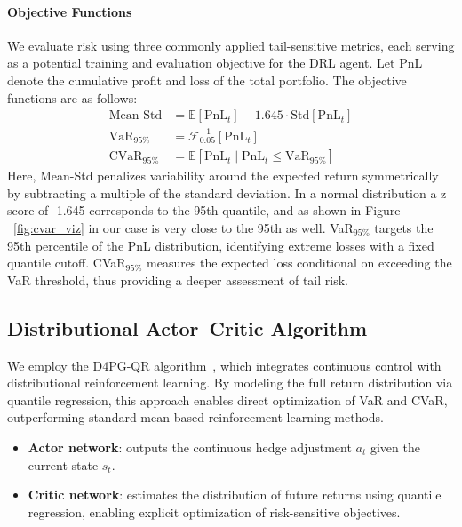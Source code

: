 \documentclass[a4paper,fleqn]{cas-dc}
\begin{document}
\paragraph{Objective Functions}
We evaluate risk using three commonly applied tail-sensitive metrics, each serving as a potential training and evaluation objective for the DRL agent. Let $\text{PnL}$ denote the cumulative profit and loss of the total portfolio. The objective functions are as follows:
\begin{align*}
    \text{Mean-Std} &= \mathbb{E}[\text{PnL}_t] - 1.645 \cdot \text{Std}[\text{PnL}_t] \\
    \text{VaR}_{95\%} &= \mathcal{F}^{-1}_{0.05}[\text{PnL}_t] \\
    \text{CVaR}_{95\%} &= \mathbb{E}[\text{PnL}_t \mid \text{PnL}_t \leq \text{VaR}_{95\%}]
\end{align*}
Here, Mean-Std penalizes variability around the expected return symmetrically by subtracting a multiple of the standard deviation. In a normal distribution a z score of -1.645 corresponds to the 95th quantile, and as shown in Figure ~\ref{fig:cvar_viz} in our case is very close to the 95th as well. VaR$_{95\%}$ targets the 95th percentile of the PnL distribution, identifying extreme losses with a fixed quantile cutoff. CVaR$_{95\%}$ measures the expected loss conditional on exceeding the VaR threshold, thus providing a deeper assessment of tail risk.

\subsection{Distributional Actor–Critic Algorithm}

We employ the D4PG-QR algorithm~\cite{DRL_3, DH_1}, which integrates continuous control with distributional reinforcement learning. By modeling the full return distribution via quantile regression, this approach enables direct optimization of VaR and CVaR, outperforming standard mean-based reinforcement learning methods.

\begin{itemize}[noitemsep, left=10pt]
    \item \textbf{Actor network}: outputs the continuous hedge adjustment $a_t$ given the current state $s_t$.
    \item \textbf{Critic network}: estimates the distribution of future returns using quantile regression, enabling explicit optimization of risk-sensitive objectives.
\end{itemize}
\end{document}
